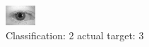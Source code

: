 \begin{figure}[h!]
\begin{center}
\includegraphics[width=0.60\columnwidth]{figures/ID517_class_2_target_3.png}
\end{center}
\caption{ Classification: 2 actual target: 3}
\label{fig:ID517_class_2_target_3}
\end{figure}
